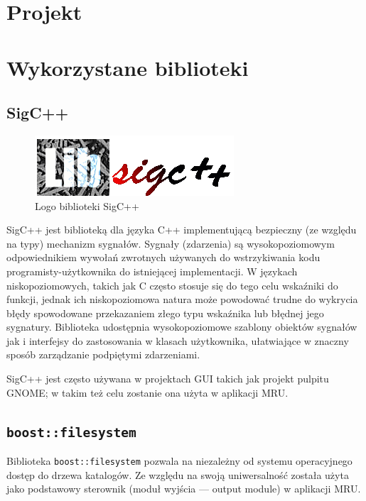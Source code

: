 \section{Projekt}


\section{Wykorzystane biblioteki}
\subsection{SigC++}
\begin{figure}
\begin{center}
\includegraphics[scale=0.50]{img/sigcpp_logo.png}
\end{center}
\caption{Logo biblioteki SigC++}
\end{figure}
\par
SigC++ jest biblioteką dla języka C++ implementującą bezpieczny (ze względu na typy) mechanizm sygnałów.
Sygnały (zdarzenia) są wysokopoziomowym odpowiednikiem wywołań zwrotnych używanych do wstrzykiwania kodu programisty-użytkownika do istniejącej implementacji. W językach niskopoziomowych, takich jak C często stosuje się do tego celu wskaźniki do funkcji, jednak ich niskopoziomowa natura może powodować trudne do wykrycia błędy spowodowane przekazaniem złego typu wskaźnika lub błędnej jego sygnatury. Biblioteka udostępnia wysokopoziomowe szablony obiektów sygnałów jak i interfejsy do zastosowania w klasach użytkownika, ułatwiające w znaczny sposób zarządzanie podpiętymi zdarzeniami.\\
\par
SigC++ jest często używana w projektach GUI takich jak projekt pulpitu GNOME; w takim też celu zostanie ona użyta w aplikacji MRU.

\subsection{\texttt{boost::filesystem}}
\par
Biblioteka \texttt{boost::filesystem} pozwala na niezależny od systemu operacyjnego dostęp do drzewa katalogów. Ze względu na swoją uniwersalność została użyta jako podstawowy sterownik (moduł wyjścia --- output module) w aplikacji MRU.

